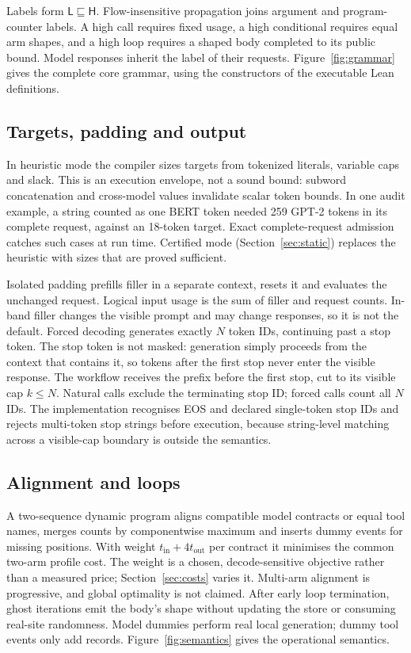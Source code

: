 \documentclass[preprint,12pt]{elsarticle}
\theoremstyle{definition}
\newcommand{\lo}{\mathsf{L}}\newcommand{\hi}{\mathsf{H}}
\begin{document}
Labels form $\lo\sqsubseteq\hi$. Flow-insensitive propagation joins argument and
program-counter labels. A high call requires fixed usage, a high conditional
requires equal arm shapes, and a high loop requires a shaped body completed to its
public bound. Model responses inherit the label of their requests.
Figure~\ref{fig:grammar} gives the complete core grammar, using the constructors
of the executable Lean definitions.


\subsection{Targets, padding and output}

In heuristic mode the compiler sizes targets from tokenized literals, variable
caps and slack. This is an execution envelope, not a sound bound: subword
concatenation and cross-model values invalidate scalar token bounds. In one audit
example, a string counted as one BERT token needed 259 GPT-2 tokens in its
complete request, against an 18-token target. Exact complete-request admission
catches such cases at run time. Certified mode (Section~\ref{sec:static}) replaces
the heuristic with sizes that are proved sufficient.

Isolated padding prefills filler in a separate context, resets it and evaluates
the unchanged request. Logical input usage is the sum of filler and request
counts. In-band filler changes the visible prompt and may change responses, so it
is not the default. Forced decoding generates exactly $N$ token IDs, continuing
past a stop token. The stop token is not masked: generation simply proceeds
from the context that contains it, so tokens after the first stop never enter
the visible response. The workflow receives the prefix before the first stop, cut to
its visible cap $k\leq N$. Natural calls exclude the terminating stop ID; forced
calls count all $N$ IDs. The implementation recognises EOS and declared
single-token stop IDs and rejects multi-token stop strings before execution,
because string-level matching across a visible-cap boundary is outside the
semantics.

\subsection{Alignment and loops}

A two-sequence dynamic program aligns compatible model contracts or equal tool
names, merges counts by componentwise maximum and inserts dummy events for
missing positions. With weight $t_{\mathrm{in}}+4t_{\mathrm{out}}$ per contract it
minimises the common two-arm profile cost. The weight is a chosen,
decode-sensitive objective rather than a measured price; Section~\ref{sec:costs}
varies it. Multi-arm alignment is progressive, and global optimality is not
claimed. After early loop termination, ghost iterations emit the body's shape
without updating the store or consuming real-site randomness. Model dummies
perform real local generation; dummy tool events only add records.
Figure~\ref{fig:semantics} gives the operational semantics.

\end{document}
